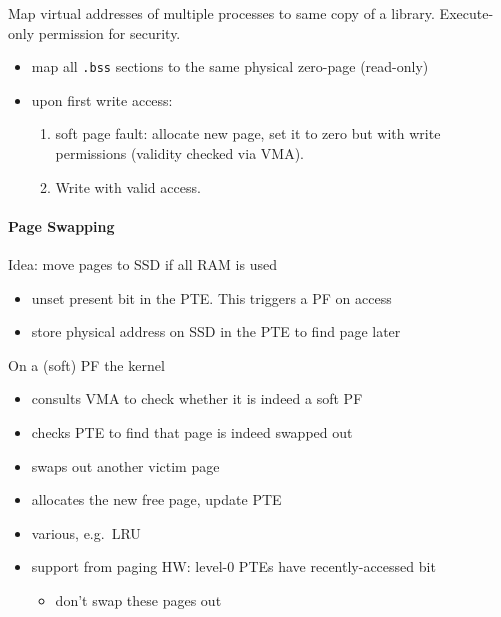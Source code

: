 \newpar{}

Map virtual addresses of multiple processes to same copy of a library. Execute-only permission for security.

\newpar{}

\begin{itemize}
    \item map all \texttt{.bss} sections to the same physical zero-page (read-only)
    \item upon first write access:
          \begin{enumerate}
              \item soft page fault: allocate new page, set it to zero but with write permissions (validity checked via VMA). 
              \item Write with valid access.
          \end{enumerate}
\end{itemize}

\paragraph{Page Swapping}
Idea: move pages to SSD if all RAM is used
\begin{itemize}
    \item unset present bit in the PTE. This triggers a PF on access
    \item store physical address on SSD in the PTE to find page later
\end{itemize}

\newpar{}

On a (soft) PF the kernel
\begin{itemize}
    \item consults VMA to check whether it is indeed a soft PF
    \item checks PTE to find that page is indeed swapped out
    \item swaps out another victim page
    \item allocates the new free page, update PTE
\end{itemize}

\newpar{}

\begin{itemize}
    \item various, e.g.\ LRU
    \item support from paging HW: level-0 PTEs have recently-accessed bit
          \begin{itemize}
              \item don't swap these pages out
          \end{itemize}
\end{itemize}

